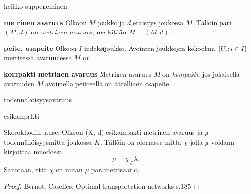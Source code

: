 \begin{definition}
    heikko suppeneminen
\end{definition}


\begin{definition}
    \textbf{metrinen avaruus} Olkoon $M$ joukko ja $d$ etäisyys joukossa $M$. Tällöin pari $(M, d)$ on \textit{metrinen avaruus}, merkitään $M = (M, d)$.
\end{definition}

\begin{definition}
    \textbf{peite, osapeite} Olkoon $I$ indeksijoukko. Avointen joukkojen kokoelma $\{U_i \colon i \in I\}$ metrisessä avaruudessa $M$ on 
\end{definition}

\begin{definition}
    \textbf{kompakti metrinen avaruus} Metrinen avaruus $M$ on \textit{kompakti}, jos jokaisella avaruuden $M$ avoimella peitteellä on äärellinen osapeite.
\end{definition}
\begin{definition}
    todennäköisyysavaruus
\end{definition}


\begin{definition}
    esikompakti
\end{definition}

\begin{theorem}
    Skorokhodin lause: Olkoon (K, d) esikompakti metrinen avaruus ja $\mu$ todennäköisyysmitta joukossa $K$. Tällöin on olemassa mitta $\chi$ jolla  $\mu$ voidaan kirjoittaa muodossa
    $$ \mu = \chi_\# \lambda. $$
    Sanotaan, että $\chi$ on mitan $\mu$ parametrisaatio.
\end{theorem}
\begin{proof}
Bernot, Caselles: Optimal transportation networks s.185
\end{proof}

